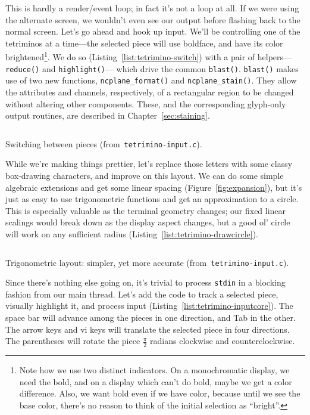 This is hardly a render/event loop; in fact it's not a loop at all. If we were
using the alternate screen, we wouldn't even see our output before flashing back to
the normal screen. Let's go ahead and hook up input. We'll be controlling one
of the tetriminos at a time---the selected piece will use boldface, and have its
color brightened\footnote{Note how we use two distinct indicators. On a monochromatic
display, we need the bold, and on a display which can't do bold, maybe we get a
color difference. Also, we want bold even if we have color, because until we
see the base color, there's no reason to think of the initial selection as
``bright''.}. We do so (Listing~\ref{list:tetrimino-switch}) with a pair of
helpers---\texttt{reduce()} and \texttt{highlight()}--- which drive the common
\texttt{blast()}. \texttt{blast()} makes use of two new functions,
\texttt{ncplane\_format()} and \texttt{ncplane\_stain()}. They allow the
attributes and channels, respectively, of a rectangular region to be changed
without altering other components. These, and the corresponding glyph-only output routines,
are described in Chapter~\ref{sec:staining}.

\begin{listing}[!htbp]
\inputminted[]{C}{code/tetrimino-switch.h}
\caption{Switching between pieces (from~\texttt{tetrimino-input.c}).}
\label{list:tetrimino-switch}
\end{listing}

While we're making things prettier, let's replace
those letters with some classy box-drawing characters, and improve on this
layout. We can do some simple algebraic extensions and get some linear spacing
(Figure~\ref{fig:expansion}), but it's just as easy to use trigonometric
functions and get an approximation to a circle. This is especially valuable as
the terminal geometry changes; our fixed linear scalings would break down as
the display aspect changes, but a good ol' circle will work on any sufficient
radius (Listing~\ref{list:tetrimino-drawcircle}).

\begin{listing}[!htbp]
\inputminted[]{C}{code/tetrimino-drawcircle.h}
\caption{Trigonometric layout: simpler, yet more accurate (from~\texttt{tetrimino-input.c}).}
\label{list:tetrimino-drawcircle}
\end{listing}

Since there's nothing else going on, it's trivial to process \texttt{stdin} in
a blocking fashion from our main thread. Let's add the code to track a selected
piece, visually highlight it, and process input (Listing~\ref{list:tetrimino-inputcore}).
The space bar will advance among the pieces in one direction,
and Tab in the other. The arrow keys and vi keys will translate the selected
piece in four directions. The parentheses will rotate the piece $\frac{\pi}{2}$ radians
clockwise and counterclockwise.

